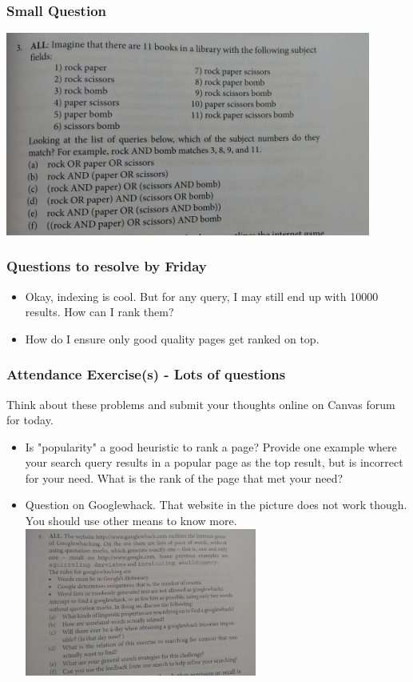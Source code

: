 \documentclass{beamer}
\begin{document}
\begin{frame} %
\frametitle{Small Question}
\includegraphics[width=0.9\textwidth]{Q1.jpg}
\end{frame}

\begin{frame}
\frametitle{Questions to resolve by Friday}
\begin{itemize}
\item Okay, indexing is cool. But for any query, I may still end up with 10000 results. How can I rank them?
\item How do I ensure only good quality pages get ranked on top. 
\end{itemize}
\end{frame}

\begin{frame}
\frametitle{Attendance Exercise(s) - Lots of questions}
Think about these problems and submit your thoughts online on Canvas forum for today. 
\begin{itemize}
\item Is "popularity" a good heuristic to rank a page? Provide one example where your search query results in a popular page as the top result, but is incorrect for your need. What is the rank of the page that met your need?
\item Question on Googlewhack. That website in the picture does not work though. You should use other means to know more.  
\includegraphics[width=0.6\textwidth]{20Sep-120Exercise.jpg}
\end{itemize}
\end{frame}%
\end{document}
